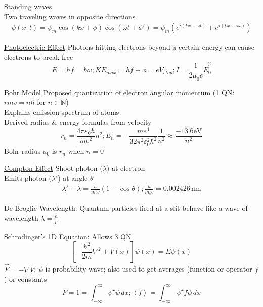\documentclass[8pt]{extarticle}
\begin{document}
    \underline{Standing waves}\\
    Two traveling waves in opposite directions
    \begin{gather*}
        \psi(x,t)   =   \psi_m \cos(kx + \phi)\cos(\omega t + \phi')
        =   \psi_m \left( e^{i(kx - \omega t)} + e^{i(kx + \omega t)} \right)
    \end{gather*}

    \underline{Photoelectric Effect}
        Photons hitting electrons beyond a certain energy can cause electrons to break free
        \begin{equation*}
            {\scriptstyle E = hf = \hbar\omega; KE_{max} = hf - \phi = eV_{stop}; I = \frac{1}{2\mu_0 c} \vec{E}_0^2}
        \end{equation*}

    \underline{Bohr Model} Proposed quantization of electron angular momentum (1 QN: $rmv = n\hbar$ for $n \in \mathbb{N}$)\\
        Explains emission spectrum of atoms\\
        Derived radius \& energy formulas from velocity
        \begin{equation*}
            r_n = \frac{4\pi\varepsilon_0\hbar}{me^2}n^2;
            E_n = -\frac{me^4}{32\pi^2\varepsilon_0^2\hbar^2}\frac{1}{n^2} \approx \frac{-13.6\unit{\eV}}{n^2}
        \end{equation*}
        Bohr radius $a_0$ is $r_n$ when $n = 0$

    \underline{Compton Effect} Shoot photon ($\lambda$) at electron\\ Emits photon ($\lambda'$) at angle $\theta$
    \begin{gather*}
        \lambda' - \lambda = \frac{h}{m_e c} (1 - \cos\theta);
        \frac{h}{m_e c} = 0.002426\,\unit{\nano\meter}
    \end{gather*}

    De Broglie Wavelength: Quantum particles fired at a slit behave like a wave of wavelength $\lambda = \frac{h}{p}$

    \underline{Schrodinger's 1D Equation}: Allows 3 QN
    \begin{equation*}
        \left[ -\frac{\hbar^2}{2m}\nabla^2 + V(x) \right]\psi(x) = E\psi(x)
    \end{equation*}
    $\vec{F} = -\nabla V$; $\psi$ is probability wave; also used to get averages (function or operator $f$) or constants\\
    \begin{equation*}
        P = 1 = \int_{-\infty}^{\infty} \psi^\star \psi\,dx; \left\langle f \right\rangle = \int_{-\infty}^{\infty} \psi^\star f \psi\,dx
    \end{equation*}
\end{document}
